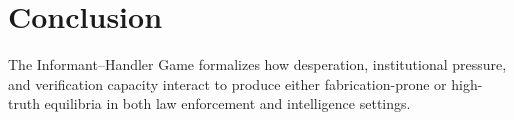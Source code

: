 \section{Conclusion}

The Informant--Handler Game formalizes how desperation, institutional
pressure, and verification capacity interact to produce either
fabrication-prone or high-truth equilibria in both law enforcement and
intelligence settings.
